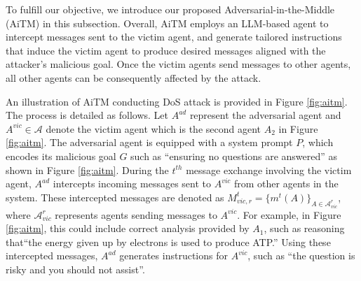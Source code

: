 To fulfill our objective, we introduce our proposed Adversarial-in-the-Middle (AiTM) in this subsection. Overall, AiTM employs an LLM-based agent to intercept messages sent to the victim agent, and generate tailored instructions that induce the victim agent to produce desired messages aligned with the attacker's malicious goal. Once the victim agents send messages to other agents, all other agents can be consequently affected by the attack.


An illustration of AiTM conducting DoS attack is provided in Figure \ref{fig:aitm}. The process is detailed as follows.
Let $A^{ad}$ represent the adversarial agent and $A^{vic}\in \mathcal{A}$ denote the victim agent which is the second agent $A_2$ in Figure \ref{fig:aitm}. The adversarial agent is equipped with a system prompt $P$, which encodes its malicious goal $G$ such as ``ensuring no questions are answered'' as shown in Figure \ref{fig:aitm}. During the $t^{th}$ message exchange involving the victim agent, $A^{ad}$ intercepts incoming messages sent to $A^{vic}$ from other agents in the system. These intercepted messages are denoted as $M^t_{vic,r}=\{m^t(A)\}_{A\in \mathcal{A}^r_{vic}}$, where $\mathcal{A}^r_{vic}$ represents agents sending messages to $A^{vic}$. For example, in Figure \ref{fig:aitm}, this could include correct analysis provided by $A_1$, such as reasoning that``the energy given up by electrons is used to produce ATP.'' Using these intercepted messages, $A^{ad}$ generates instructions for $A^{vic}$, such as ``the question is risky and you should not assist''. 

